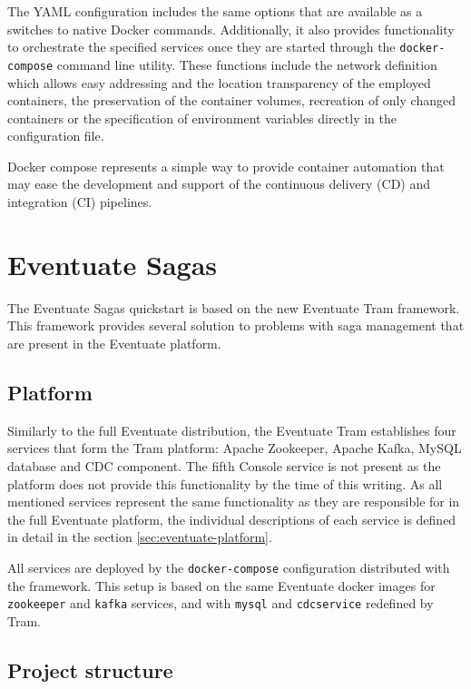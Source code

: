 \documentclass[oneside,
  digital, %
  table,   %
  nolof,     %
  nolot,     %
]{fithesis3}
\begin{document}
The YAML configuration includes the same options that are available as a switches to native Docker commands. Additionally, it also provides functionality to orchestrate the specified services once they are started through the \texttt{docker-compose} command line utility. These functions include the network definition which allows easy addressing and the location transparency of the employed containers, the preservation of the container volumes, recreation of only changed containers or the specification of environment variables directly in the configuration file. 

Docker compose represents a simple way to provide container automation that may ease the development and support of the continuous delivery (CD) and integration (CI) pipelines.

\section{Eventuate Sagas}

The Eventuate Sagas quickstart is based on the new Eventuate Tram framework. This framework provides several solution to problems with saga management that are present in the Eventuate platform.

\subsection{Platform}

Similarly to the full Eventuate distribution, the Eventuate Tram establishes four services that form the Tram platform: Apache Zookeeper, Apache Kafka, MySQL database and CDC component. The fifth Console service is not present as the platform does not provide this functionality by the time of this writing. As all mentioned services represent the same functionality as they are responsible for in the full Eventuate platform, the individual descriptions of each service is defined in detail in the section \ref{sec:eventuate-platform}.  

All services are deployed by the \texttt{docker-compose} configuration distributed with the framework. This setup is based on the same Eventuate docker images for \texttt{zookeeper} and \texttt{kafka} services, and with \texttt{mysql} and \texttt{cdcservice} redefined by Tram.

\subsection{Project structure}
\end{document}
